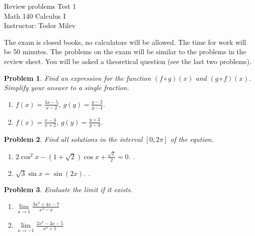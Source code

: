\documentclass{article}
\newtheorem{problem}{Problem}
\begin{document}
\begin{center}
\Large
Review problems Test 1\\ Math 140 Calculus I \\ \normalsize Instructor: Todor Milev
\end{center}


\noindent The exam is closed books, no calculators will be allowed. The time for work will be 50 minutes. The problems on the exam will be similar to the problems in the review sheet. You will be asked a theoretical question (see the last two problems).
\begin{problem}
Find an expression for the function $(f\circ g)(x)$ and $(g\circ f)(x)$. Simplify your answer to a single fraction. 
\begin{enumerate}
\item $ f(x)= \frac{3x-5}{x-2}$, $g(y)=\frac{y-2 }{y-4} $. 
\item $ f(x)= \frac{x-3}{x+2}$, $g(y)=\frac{y+3 }{y-4} $. 
\end{enumerate}
\end{problem}
\begin{problem}
Find all solutions in the interval $[0,2\pi]$ of the eqution.
\begin{enumerate}
\item $2\cos^{2}x-(1+\sqrt{2})\cos x+\frac{\sqrt{2}}{2}=0$. .
\item $\sqrt {3} \sin x= \sin (2x)$.  .
\end{enumerate}
\end{problem}
\begin{problem}
Evaluate the limit if it exists.
\begin{enumerate}
\item $\lim\limits_{x\to 1} \frac{3x^2+4x-7}{x^3-x}$ 
\item $\lim\limits_{x\to -1} \frac{2x^2-3x-5}{x^3+1}$ 
\end{enumerate}
\end{problem}
\end{document}
